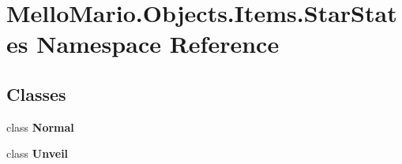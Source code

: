 \section{Mello\+Mario.\+Objects.\+Items.\+Star\+States Namespace Reference}
\label{namespaceMelloMario_1_1Objects_1_1Items_1_1StarStates}
\subsection*{Classes}
\begin{DoxyCompactItemize}
\item 
class \textbf{ Normal}
\item 
class \textbf{ Unveil}
\end{DoxyCompactItemize}
